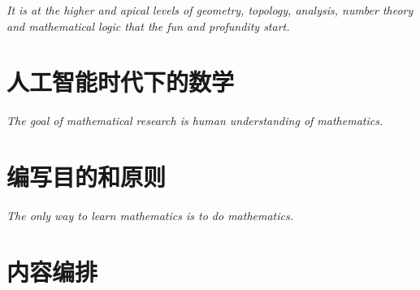 \emph{It is at the higher and apical levels of geometry, topology, analysis, number theory and mathematical logic that the fun and profundity start.}
\par {}

\section*{人工智能时代下的数学}

\emph{The goal of mathematical research is human understanding of mathematics.}
\par {}

\section*{编写目的和原则}

\emph{The only way to learn mathematics is to do mathematics.} \par {}

\section*{内容编排}
